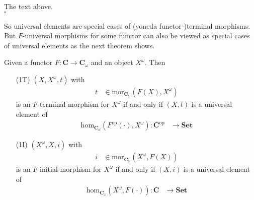 \begin{prf}
The text above.
\\
\phantom{proven}
\hfill
$\square$
\end{prf}
So universal elements are special cases of (yoneda functor-)terminal morphisms. But $F$-universal morphisms for some functor can also be viewed as special cases of universal elements as the next theorem shows.
\\
\begin{thm}
\label{thm:unielemequivuni2}
Given a functor $F \colon \mathbf{C} \rightarrow \mathbf{C}_{\omega}$ and an object $X^{\omega}$. Then
\begin{enumerate}
\item[(1T)]
$(X,X^{\omega},t)$ with
\begin{align*}
  t
  &\in
  \mathrm{mor}_{\mathbf{C}_{\omega}}(F(X),X^{\omega})
\end{align*}
is an $F$-terminal morphism for $X^{\omega}$ if and only if $(X,t)$ is a universal element of
\begin{align*}
  \mathrm{hom}_{\mathbf{C}_{\omega}}(F^{\mathrm{op}}(\cdot),X^{\omega})
  \colon
  \mathbf{C}^{\mathrm{op}}
  &\rightarrow
  \mathbf{Set}
\end{align*}
\item[(1I)]
$(X^{\omega},X,i)$ with
\begin{align*}
  i
  &\in
  \mathrm{mor}_{\mathbf{C}_{\omega}}(X^{\omega},F(X))
\end{align*}
is an $F$-initial morphism for $X^{\omega}$ if and only if $(X,i)$ is a universal element of
\begin{align*}
  \mathrm{hom}_{\mathbf{C}_{\omega}}(X^{\omega},F(\cdot))
  \colon
  \mathbf{C}
  &\rightarrow
  \mathbf{Set}
\end{align*}
\end{enumerate}
\end{thm}
